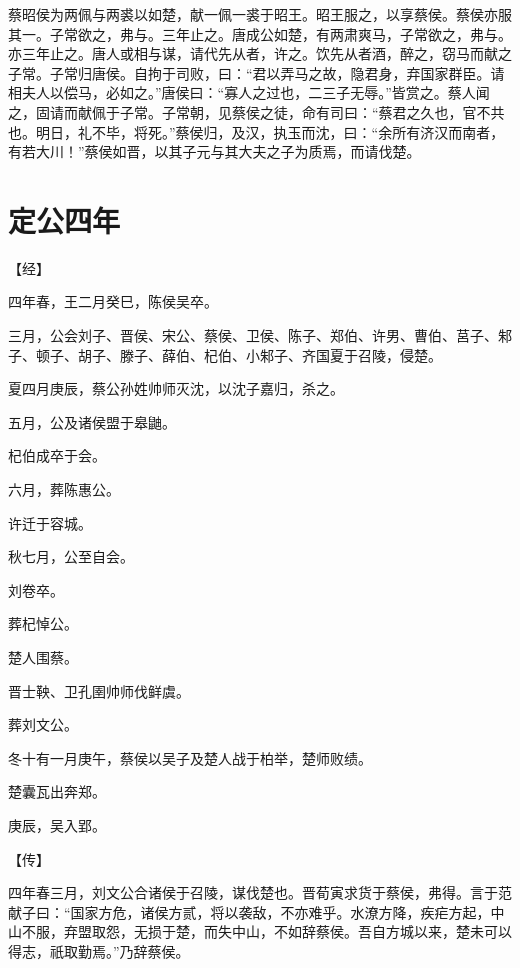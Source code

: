 \documentclass[a4paper,12pt,UTF8,twoside]{ctexbook}
\begin{document}
蔡昭侯为两佩与两裘以如楚，献一佩一裘于昭王。昭王服之，以享蔡侯。蔡侯亦服其一。子常欲之，弗与。三年止之。唐成公如楚，有两肃爽马，子常欲之，弗与。亦三年止之。唐人或相与谋，请代先从者，许之。饮先从者酒，醉之，窃马而献之子常。子常归唐侯。自拘于司败，曰：“君以弄马之故，隐君身，弃国家群臣。请相夫人以偿马，必如之。”唐侯曰：“寡人之过也，二三子无辱。”皆赏之。蔡人闻之，固请而献佩于子常。子常朝，见蔡侯之徒，命有司曰：“蔡君之久也，官不共也。明日，礼不毕，将死。”蔡侯归，及汉，执玉而沈，曰：“余所有济汉而南者，有若大川！”蔡侯如晋，以其子元与其大夫之子为质焉，而请伐楚。

\section{定公四年}


【经】

四年春，王二月癸巳，陈侯吴卒。

三月，公会刘子、晋侯、宋公、蔡侯、卫侯、陈子、郑伯、许男、曹伯、莒子、邾子、顿子、胡子、滕子、薛伯、杞伯、小邾子、齐国夏于召陵，侵楚。

夏四月庚辰，蔡公孙姓帅师灭沈，以沈子嘉归，杀之。

五月，公及诸侯盟于皋鼬。

杞伯成卒于会。

六月，葬陈惠公。

许迁于容城。

秋七月，公至自会。

刘卷卒。

葬杞悼公。

楚人围蔡。

晋士鞅、卫孔圉帅师伐鲜虞。

葬刘文公。

冬十有一月庚午，蔡侯以吴子及楚人战于柏举，楚师败绩。

楚囊瓦出奔郑。

庚辰，吴入郢。

【传】

四年春三月，刘文公合诸侯于召陵，谋伐楚也。晋荀寅求货于蔡侯，弗得。言于范献子曰：“国家方危，诸侯方贰，将以袭敌，不亦难乎。水潦方降，疾疟方起，中山不服，弃盟取怨，无损于楚，而失中山，不如辞蔡侯。吾自方城以来，楚未可以得志，祇取勤焉。”乃辞蔡侯。
\end{document}
